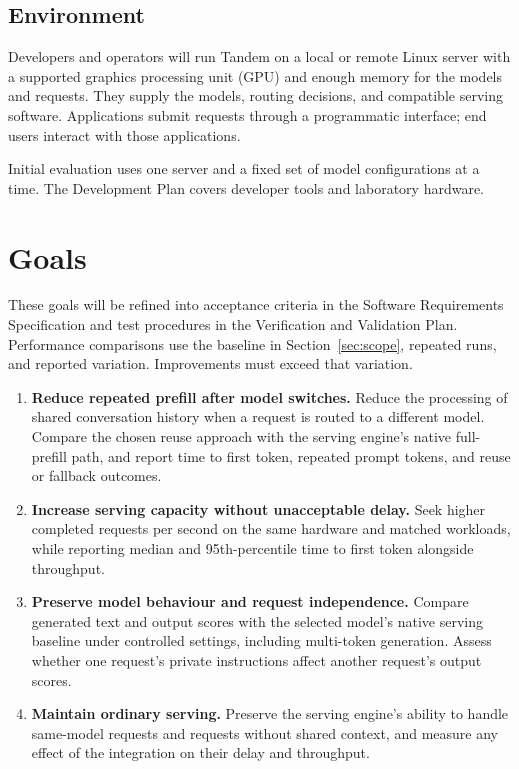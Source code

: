 \documentclass[11pt]{article}
\begin{document}
\subsection{Environment}

Developers and operators will run Tandem on a local or remote Linux server
with a supported graphics processing unit (GPU) and enough memory for the
models and requests. They supply the models, routing decisions, and
compatible serving software. Applications submit requests through a
programmatic interface; end users interact with those applications.

Initial evaluation uses one server and a fixed set of model configurations
at a time. The Development Plan covers developer tools and laboratory
hardware.

\section{Goals}

These goals will be refined into acceptance criteria in the Software
Requirements Specification and test procedures in the Verification and
Validation Plan. Performance comparisons use the baseline in
Section~\ref{sec:scope}, repeated runs, and reported variation. Improvements
must exceed that variation.

\begin{enumerate}[label=G\arabic*., ref=G\arabic*]
  \item \textbf{Reduce repeated prefill after model switches.} Reduce the
  processing of shared conversation history when a request is routed to a
  different model. Compare the chosen reuse approach with the serving
  engine's native full-prefill path, and report time to first token,
  repeated prompt tokens, and reuse or fallback outcomes.
  \item \textbf{Increase serving capacity without unacceptable delay.}
  Seek higher completed requests per second on the same hardware and matched
  workloads, while reporting median and 95th-percentile time to first token
  alongside throughput.
  \item \textbf{Preserve model behaviour and request independence.}
  Compare generated text and output scores with the selected model's native
  serving baseline under controlled settings, including multi-token
  generation. Assess whether one request's private instructions affect
  another request's output scores.
  \item \textbf{Maintain ordinary serving.} Preserve the serving engine's
  ability to handle same-model requests and requests without shared context,
  and measure any effect of the integration on their delay and throughput.
\end{enumerate}
\end{document}
